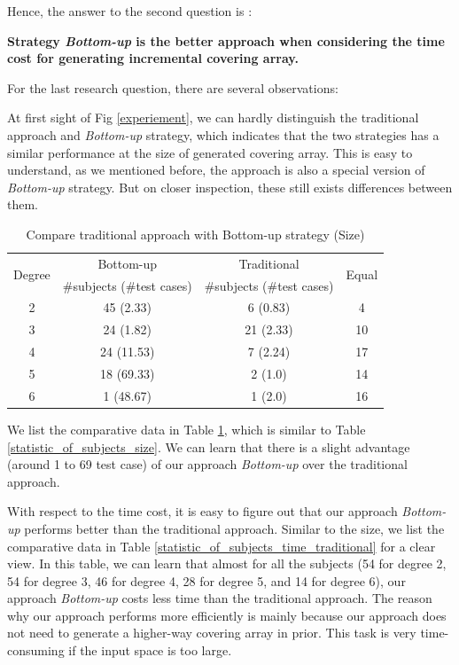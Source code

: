 \documentclass[conference]{IEEEtran}
\theoremstyle{definition}
\begin{document}
Hence, the answer to the second question is :

\textbf{Strategy \emph{Bottom-up} is the better approach when considering the time cost for generating incremental covering array. }

For the last research question, there are several observations:

At first sight of Fig \ref{experiement}, we can hardly distinguish the traditional approach and \emph{Bottom-up} strategy, which indicates that the two strategies has a similar performance at the size of generated covering array. This is easy to understand, as we mentioned before, the approach \cite{fouche2009incremental} is also a special version of \emph{Bottom-up} strategy.
But on closer inspection, these still exists differences between them.

\begin{table}[!ht]
\caption{Compare traditional approach with Bottom-up strategy (Size)}
\label{statistic_of_subjects_size_tranditional}
\center
    \begin{tabular}{|c|c|c|c|} \hline
\multirow{2}{*}{Degree} & Bottom-up & Traditional & \multirow{2}{*}{Equal} \\\cline{2-3}
 & \#subjects (\#test cases) & \#subjects (\#test cases) &  \\\hline
2 & 45 (2.33) & 6 (0.83) & 4 \\
3 & 24 (1.82) & 21 (2.33) & 10 \\
4 & 24 (11.53) & 7 (2.24) & 17 \\
5 & 18 (69.33) & 2 (1.0) & 14 \\
6 & 1 (48.67) & 1 (2.0) & 16 \\ \hline
    \end{tabular}%
\end{table}

We list the comparative data in Table \ref{statistic_of_subjects_size_tranditional}, which is similar to Table \ref{statistic_of_subjects_size}. We can learn that there is a slight advantage (around 1 to 69 test case) of our approach \emph{Bottom-up} over the traditional approach.

With respect to the time cost, it is easy to figure out that our approach \emph{Bottom-up} performs better than the traditional approach. Similar to the size, we list the comparative data in Table \ref{statistic_of_subjects_time_traditional} for a clear view. In this table, we can learn that almost for all the subjects (54 for degree 2, 54 for degree 3, 46 for degree 4, 28 for degree 5, and 14 for degree 6), our approach \emph{Bottom-up} costs less time than the traditional approach.  The reason why our approach performs more efficiently is mainly because our approach does not need to generate a higher-way covering array in prior. This task is very time-consuming if the input space is too large.
\end{document}
